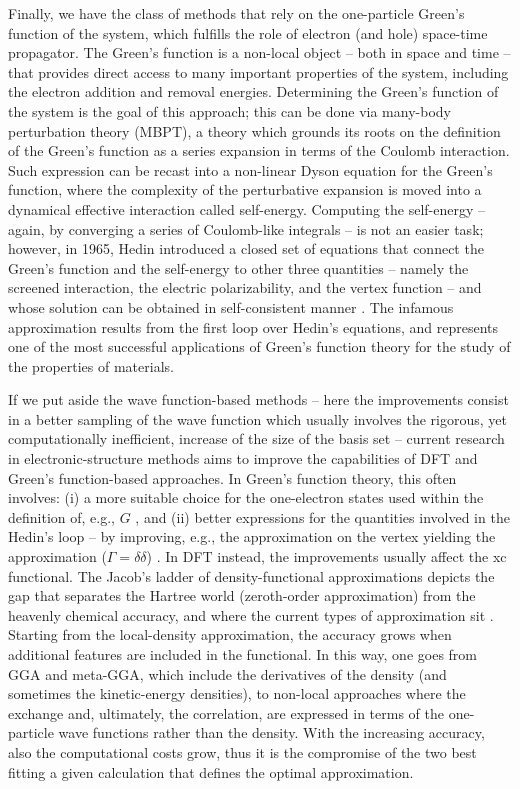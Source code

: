 Finally, we have the class of methods that rely on the one-particle Green's function of the system, which fulfills the role of electron (and hole) space-time propagator. The Green's function is a non-local object -- both in space and time -- that provides direct access to many important properties of the system, including the electron addition and removal energies. Determining the Green's function of the system is the goal of this approach; this can be done via many-body perturbation theory (MBPT), a theory which grounds its roots on the definition of the Green's function as a series expansion in terms of the Coulomb interaction. Such expression can be recast into a non-linear Dyson equation for the Green's function, where the complexity of the perturbative expansion is moved into a dynamical effective interaction called self-energy. Computing the self-energy -- again, by converging a series of Coulomb-like integrals -- is not an easier task; however, in 1965, Hedin introduced a closed set of equations that connect the Green's function and the self-energy to other three quantities -- namely the screened interaction, the electric polarizability, and the vertex function -- and whose solution can be obtained in self-consistent manner \cite{hedin_new_1965}. The infamous \gw approximation results from the first loop over Hedin's equations, and represents one of the most successful applications of Green's function theory for the study of the properties of materials.

If we put aside the wave function-based methods -- here the improvements consist in a better sampling of the wave function which usually involves the rigorous, yet computationally inefficient, increase of the size of the basis set -- current research in electronic-structure methods aims to improve the capabilities of DFT and Green's function-based approaches. In Green's function theory, this often involves: (i) a more suitable choice for the one-electron states used within the definition of, e.g., $G$ \cite{bruneval_benchmarking_2013}, and (ii) better expressions for the quantities involved in the Hedin's loop -- by improving, e.g., the approximation on the vertex yielding the \gw approximation ($\Gamma=\delta \delta$) \cite{chen_accurate_2015}. In DFT instead, the improvements usually affect the xc functional. The Jacob's ladder of density-functional approximations depicts the gap that separates the Hartree world (zeroth-order approximation) from the heavenly chemical accuracy, and where the current types of approximation sit \cite{perdew_jacobs_2001}. Starting from the local-density approximation, the accuracy grows when additional features are included in the functional. In this way, one goes from GGA and meta-GGA, which include the derivatives of the density (and sometimes the kinetic-energy densities), to non-local approaches where the exchange and, ultimately, the correlation, are expressed in terms of the one-particle wave functions rather than the density. With the increasing accuracy, also the computational costs grow, thus it is the compromise of the two best fitting a given calculation that defines the optimal approximation.

